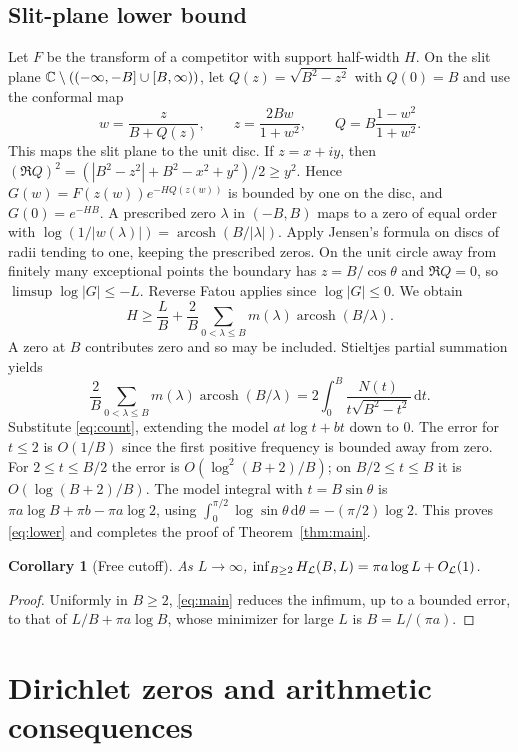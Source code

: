 \documentclass[11pt,letterpaper]{article}
\newtheorem{corollary}[theorem]{Corollary}
\theoremstyle{remark}\newtheorem{remark}[theorem]{Remark}
\newcommand{\dd}{\,\mathrm d}\newcommand{\sinc}{\operatorname{sinc}}
\newcommand{\arcosh}{\operatorname{arcosh}}\newcommand{\sech}{\operatorname{sech}}
\begin{document}
\subsection{Slit-plane lower bound}
Let $F$ be the transform of a competitor with support half-width $H$. On the slit plane $\mathbb C\setminus(( -\infty,-B]\cup[B,\infty))$, let $Q(z)=\sqrt{B^2-z^2}$ with $Q(0)=B$ and use the conformal map
\[
 w=\frac{z}{B+Q(z)},\qquad z=\frac{2Bw}{1+w^2},\qquad Q=B\frac{1-w^2}{1+w^2}.
\]
This maps the slit plane to the unit disc. If $z=x+iy$, then $(\Re Q)^2=(|B^2-z^2|+B^2-x^2+y^2)/2\ge y^2$. Hence $G(w)=F(z(w))e^{-HQ(z(w))}$ is bounded by one on the disc, and $G(0)=e^{-HB}$. A prescribed zero $\lambda$ in $(-B,B)$ maps to a zero of equal order with $\log(1/|w(\lambda)|)=\arcosh(B/|\lambda|)$. Apply Jensen's formula on discs of radii tending to one, keeping the prescribed zeros. On the unit circle away from finitely many exceptional points the boundary has $z=B/\cos\theta$ and $\Re Q=0$, so $\limsup\log|G|\le-L$. Reverse Fatou applies since $\log|G|\le0$. We obtain
\begin{equation}\label{eq:slit}
 H\ge \frac LB+\frac2B\sum_{0<\lambda\le B}m(\lambda)\arcosh(B/\lambda).
\end{equation}
A zero at $B$ contributes zero and so may be included. Stieltjes partial summation yields
\[
 \frac2B\sum_{0<\lambda\le B}m(\lambda)\arcosh(B/\lambda)
 =2\int_0^B\frac{N(t)}{t\sqrt{B^2-t^2}}\dd t.
\]
Substitute \eqref{eq:count}, extending the model $a t\log t+b t$ down to $0$. The error for $t\le2$ is $O(1/B)$ since the first positive frequency is bounded away from zero. For $2\le t\le B/2$ the error is $O(\log^2(B+2)/B)$; on $B/2\le t\le B$ it is $O(\log(B+2)/B)$. The model integral with $t=B\sin\theta$ is $\pi a\log B+\pi b-\pi a\log2$, using $\int_0^{\pi/2}\log\sin\theta\dd\theta=-(\pi/2)\log2$. This proves \eqref{eq:lower} and completes the proof of Theorem~\ref{thm:main}.

\begin{corollary}[Free cutoff]\label{cor:free}
As $L\to\infty$, $\inf_{B\ge2}H_{\mathcal L}(B,L)=\pi a\log L+O_{\mathcal L}(1)$.
\end{corollary}
\begin{proof}
Uniformly in $B\ge2$, \eqref{eq:main} reduces the infimum, up to a bounded error, to that of $L/B+\pi a\log B$, whose minimizer for large $L$ is $B=L/(\pi a)$.
\end{proof}

\section{Dirichlet zeros and arithmetic consequences}\label{sec:arith}
\end{document}
